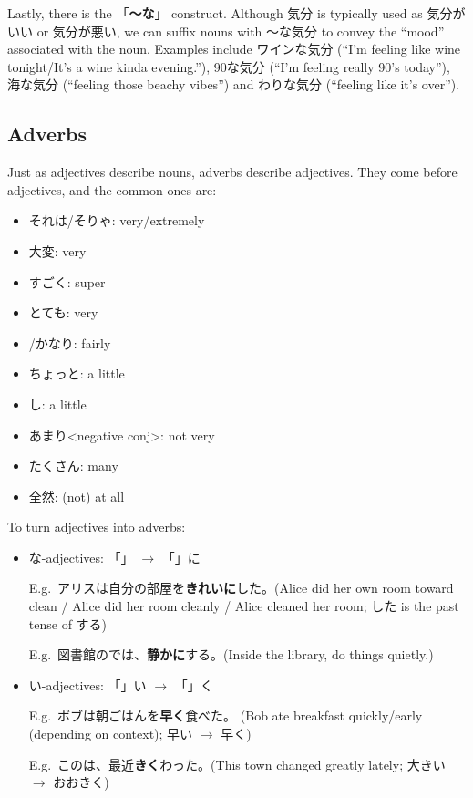 \documentclass[../nihongo-gakushuu-kyouzai.tex]{subfiles}
\begin{document}
Lastly, there is the 「\textbf{〜な}」 construct. Although 気分 is typically used as 気分がいい or 気分が悪い, we can suffix nouns with 〜な気分 to convey the ``mood'' associated with the noun. Examples include ワインな気分 (``I'm feeling like wine tonight/It's a wine kinda evening.''), 90な気分 (``I'm feeling really 90's today''), 海な気分 (``feeling those beachy vibes'') and わりな気分 (``feeling like it's over'').




\subsection{Adverbs} \label{sec:adverb}
Just as adjectives describe nouns, adverbs describe adjectives. They come before adjectives, and the common ones are:
\begin{itemize}
    \item それは/そりゃ: very/extremely
    \item 大変: very
    \item すごく: super
    \item とても: very
    \item {}/かなり: fairly
    \item ちょっと: a little
    \item {}し: a little
    \item あまり<negative conj>: not very
    \item たくさん: many
    \item 全然: (not) at all
\end{itemize}

To turn adjectives into adverbs:
\begin{itemize}
    \item な-adjectives: 「」 $\to$ 「」に

    E.g.\ アリスは自分の部屋を\textbf{きれいに}した。(Alice did her own room toward clean / Alice did her room cleanly / Alice cleaned her room; した is the past tense of する)

    E.g.\ 図書館のでは、\textbf{静かに}する。(Inside the library, do things quietly.)
    \item い-adjectives: 「」い $\to$ 「」く

    E.g.\ ボブは朝ごはんを\textbf{早く}食べた。 (Bob ate breakfast quickly/early (depending on context); 早い $\to$ 早く)

    E.g.\ このは、最近\textbf{きく}わった。(This town changed greatly lately; 大きい $\to$ おおきく)
\end{itemize}
\end{document}
